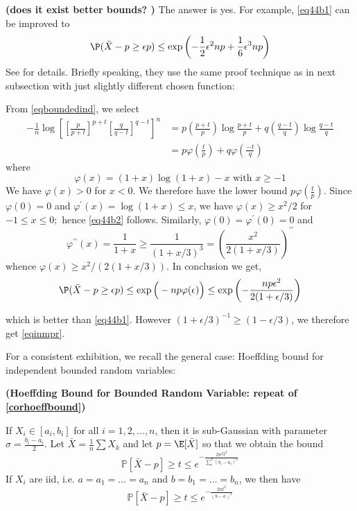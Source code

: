 \documentclass{article}
\newcommand{\bfs}[1]{\textbf{({#1})}}
\begin{document}
\begin{rema}{\bfs{does it exist better bounds? }}
The answer is yes. For example, \cref{eq44b1} can be improved to 
\begin{align}
    \P (\bar{X}- p \geq \epsilon p ) \leq \exp \left(-\frac{1}{2} \epsilon^{2} np + \frac{1}{6}\epsilon^{3} np \right)\label{eqinmpr}
\end{align}
See \cite[p.22 Corollary 2.2.]{janson2011random} for details. Briefly speaking, they use the same proof technique as in next subsection with just slightly different chosen function: 

From \cref{eqboundedind}, we select  
\begin{align*}
    -\frac{1}{n}\log \left[\left[\frac{ p }{ p + t }\right]^{ p + t }\left[\frac{ q }{ q - t }\right]^{ q - t }\right]^{ n } & =p\left(\frac{p+t}{p}\right)\log \frac{p+t}{p} +q\left(\frac{q-t}{q}\right)\log \frac{q-t}{q} \\
    & = p \varphi(\frac{t}{p}) +q \varphi(\frac{-t}{q})
\end{align*}
where 
$$\varphi(x) = (1+x)\log (1+x) -x \text{ with } x \ge -1$$
We have $\varphi(x)>0$ for $x<0$. We therefore have the lower bound $p \varphi(\frac{t}{p}) $.  Since $\varphi(0)=0$ and $\varphi^{\prime}(x)=\log (1+x) \leq x$, we have $\varphi(x) \geq x^{2} / 2$ for
$-1 \leq x \leq 0 ;$ hence \cref{eq44b2}  follows. Similarly, $\varphi(0)=\varphi^{\prime}(0)=0$ and
$$
\varphi^{\prime \prime}(x)=\frac{1}{1+x} \geq \frac{1}{(1+x / 3)^{3}}=\left(\frac{x^{2}}{2(1+x / 3)}\right)^{\prime \prime}
$$
whence $\varphi(x) \geq x^{2} /(2(1+x / 3)) .$  In conclusion we get, 
$$ \P (\bar{X}- p \geq \epsilon p ) \leq \exp \Big(-n p\varphi(\epsilon)\Big) \leq \exp \left(-\frac{np\epsilon^{2}}{2(1+\epsilon/ 3)}\right)$$
 
 which is better than \cref{eq44b1}. However $(1+\epsilon/ 3)^{-1} \geq(1-\epsilon / 3)$, we therefore get \cref{eqinmpr}.
\end{rema}

For a consistent exhibition, we recall the general case: Hoeffding bound for independent bounded random variables:
\begin{cora}{\bfs{Hoeffding Bound for Bounded Random Variable: repeat of  \cref{corhoeffbound}}}\label{correphoeff}

If $X_{i} \in[a_i, b_i]$ for all $i=1,2, \ldots, n$, then it is sub-Gaussian with parameter  $\sigma=\frac{b_i-a_i}{2}$. Let $\bar{X}=\frac{1}{n} \sum X_{k}$ and let $p=\E[\bar{X}]$ so that we obtain the bound
$$
\mathbb{P}\left[\bar{X}-p\right] \geq t \leq e^{-\frac{2 n^2t^{2}}{\sum_{i}^n(b_i-a_i)^{2}}}
$$
If $X_{i}$ are \gls{iid}, i.e. $a=a_1=\ldots=a_n$ and $b=b_1=\ldots=b_n$, we then have
$$
\mathbb{P}\left[\bar{X}-p\right] \geq t \leq e^{-\frac{2 nt^{2}}{(b-a)^{2}}}
$$
\end{cora}
\end{document}
